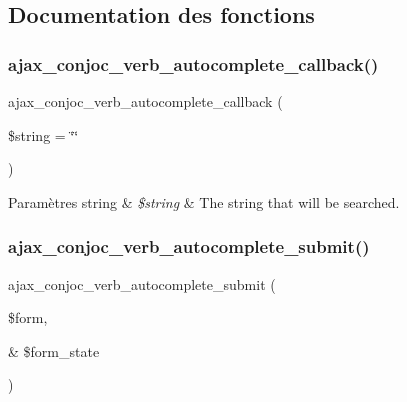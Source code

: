 \subsection{Documentation des fonctions}
\hypertarget{conjoc__webForm_8inc_a5ea54e98ecadf55b7fe917fe6237a52e}{}\label{conjoc__webForm_8inc_a5ea54e98ecadf55b7fe917fe6237a52e} 
\subsubsection{\texorpdfstring{ajax\+\_\+conjoc\+\_\+verb\+\_\+autocomplete\+\_\+callback()}{ajax\_conjoc\_verb\_autocomplete\_callback()}}
{\footnotesize\ttfamily ajax\+\_\+conjoc\+\_\+verb\+\_\+autocomplete\+\_\+callback (\begin{DoxyParamCaption}\item[{}]{\$string = {\ttfamily \char`\"{}\char`\"{}} }\end{DoxyParamCaption})}


\begin{DoxyParams}[1]{Paramètres}
string & {\em \$string} & The string that will be searched. \\
\hline
\end{DoxyParams}
\hypertarget{conjoc__webForm_8inc_add934c4187ded056db9c8369764a51ed}{}\label{conjoc__webForm_8inc_add934c4187ded056db9c8369764a51ed} 
\subsubsection{\texorpdfstring{ajax\+\_\+conjoc\+\_\+verb\+\_\+autocomplete\+\_\+submit()}{ajax\_conjoc\_verb\_autocomplete\_submit()}}
{\footnotesize\ttfamily ajax\+\_\+conjoc\+\_\+verb\+\_\+autocomplete\+\_\+submit (\begin{DoxyParamCaption}\item[{}]{\$form,  }\item[{\&}]{\$form\+\_\+state }\end{DoxyParamCaption})}

